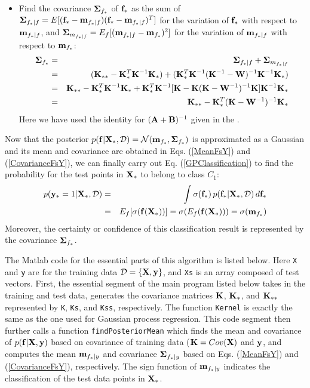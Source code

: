 \documentclass{article}
\begin{document}
\begin{itemize}
\item Find the covariance ${\bf\Sigma}_{f_*}$ of ${\bf f}_*$ as the sum of 
  ${\bf\Sigma}_{f_*|f}=E[({\bf f}_*-{\bf m}_{f_*|f})({\bf f}_*-{\bf m}_{f_*|f})^T]$
  for the variation of ${\bf f}_*$ with respect to ${\bf m}_{f_*|f}$, and 
  ${\bf\Sigma}_{m_{f_*|f}}=E_f[({\bf m}_{f_*|f}-{\bf m}_{f_*})^2]$ for the
  variation of ${\bf m}_{f_*|f}$ with respect to ${\bf m}_{f_*}$:  
  \begin{eqnarray}
    {\bf\Sigma}_{f_*}&=&{\bf\Sigma}_{f_*|f}+{\bf\Sigma}_{m_{f_*|f}}
    \nonumber\\
    &=&({\bf K}_{**}-{\bf K}_*^T{\bf K}^{-1}{\bf K}_*)
    +({\bf K}_*^T{\bf K}^{-1}({\bf K}^{-1}-{\bf W})^{-1}{\bf K}^{-1}{\bf K}_*)
    \nonumber\\
    &=&{\bf K}_{**}-{\bf K}_*^T{\bf K}^{-1}{\bf K}_*
    +{\bf K}_*^T{\bf K}^{-1} [{\bf K}-{\bf K}({\bf K}-{\bf W}^{-1})^{-1}{\bf K}]{\bf K}^{-1}{\bf K}_*
    \nonumber\\
    &=&{\bf K}_{**}-{\bf K}_*^T({\bf K}-{\bf W}^{-1})^{-1}{\bf K}_*
    \label{CovarianceFsY}
  \end{eqnarray}
  Here we have used the identity for $({\bf A}+{\bf B})^{-1}$ given 
  in the .
\end{itemize}

Now that the posterior 
$p({\bf f}|{\bf X}_*,{\cal D})={\cal N}({\bf m}_{f_*},{\bf\Sigma}_{f_*})$
is approximated as a Gaussian and its mean and covariance are
obtained in Eqs. (\ref{MeanFsY}) and (\ref{CovarianceFsY}), we 
can finally carry out Eq. (\ref{GPClassification}) to find the 
probability for the test points in ${\bf X}_*$ to belong to class
$C_1$: 
\begin{eqnarray}
  p({\bf y}_*=1|{\bf X}_*,{\cal D})
  &=&\int\sigma({\bf f}_*)\,p({\bf f}_*|{\bf X}_*,{\cal D})\,d {\bf f}_*
  \nonumber\\
  &=&E_f[ \sigma({\bf f}({\bf X}_*)) ]=\sigma(E_f({\bf f}({\bf X}_*)))
  =\sigma( {\bf m}_{f_*} )
\end{eqnarray}
Moreover, the certainty or confidence of this classification result 
is represented by the covariance ${\bf\Sigma}_{f_*}$.

The Matlab code for the essential parts of this algorithm is 
listed below. Here \verb|X| and \verb|y| are for the training data 
${\cal D}=\{{\bf X},{\bf y}\}$, and \verb|Xs| is an array composed 
of test vectors. First, the essential segment of the main program 
listed below takes in the training and test data, generates the 
covariance matrices ${\bf K}$, ${\bf K}_*$, and ${\bf K}_{**}$ 
represented by \verb|K|, \verb|Ks|, and \verb|Kss|, respectively. 
The function \verb|Kernel| is exactly the same as the one used for 
Gaussian process regression. This code segment then further calls 
a function \verb|findPosteriorMean| which finds the mean and 
covariance of $p({\bf f}|{\bf X},{\bf y})$ based on covariance of 
training data (${\bf K}=Cov({\bf X})$ and ${\bf y}$, and computes 
the mean ${\bf m}_{f_*|y}$ and covariance ${\bf\Sigma}_{f_*|y}$ based 
on Eqs. (\ref{MeanFsY}) and (\ref{CovarianceFsY}), respectively. The
sign function of ${\bf m}_{f_*|y}$ indicates the classification of 
the test data points in ${\bf X}_*$.
\end{document}
